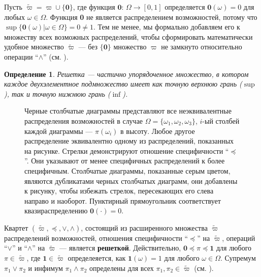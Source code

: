 \documentclass[a4paper, 14pt]{extarticle}
\newtheorem{definition}{Определение}
\begin{document}
Пусть $\widetilde{\varpi} = \varpi \cup \{ \textbf{0} \}$, где функция $\textbf{0}$: $\Omega \to [0, 1]$ определяется $\textbf{0}(\omega) = 0$ для любых $\omega \in \Omega$. Функция \textbf{0} не является распределением возможностей, потому что $\sup\{\textbf{0}(\omega) | \omega \in \Omega\} = 0 \neq 1$. Тем не менее, мы формально добавляем его к множеству всех возможных распределений, чтобы сформировать математически удобное множество $\widetilde{\varpi}$ --- без $\{ \textbf{0} \}$ множество ${\varpi}$ не замкнуто относительно операции ``$\land$'' (см. \cite{ag-op-2021}).
\begin{definition}
Решетка --- частично упорядоченное множество, в котором каждое двухэлементное подмножество имеет как точную верхнюю грань ($\sup$), так и точную нижнюю грань ($\inf$).
\end{definition}

\begin{figure}[h!]
\caption{Черные столбчатые диаграммы представляют все неэквивалентные распределения возможностей в случае $\Omega = \{\omega_1, \omega_2, \omega_3 \}$, $i$-ый столбей каждой диаграммы --- $\pi(\omega_i)$ в высоту. Любое другое распределение эквивалентно одному из распределений, показанных на рисунке. Стрелки демонстрируют отношение специфичности ``$\preceq$''. Они указывают от менее специфичных распределений к более специфичным. Столбчатые диаграммы, показанные серым цветом, являются дубликатами черных столбчатых диаграмм, они добавлены к рисунку, чтобы избежать стрелок, пересекающих его слева направо и наоборот. Пунктирный прямоугольник соответствует квазираспределению $\textbf{0}(\cdot) = 0$.}
\end{figure}

Квартет $(\widetilde{\varpi}, \preceq, \lor, \land)$, состоящий из расширенного множества $\widetilde{\varpi}$ распределений возможностей, отношения специфичности ``$\preceq$'' на $\widetilde{\varpi}$, операций ``$\lor$'' и ``$\land$'' на $\widetilde{\varpi}$ --- является \textbf{решеткой}. Действительно, $\textbf{0} \preceq \pi \preceq \textbf{1}$ для любого $\pi \in \widetilde{\varpi}$, где $\textbf{1} \in \widetilde{\varpi}$ определеяется, как $\textbf{1}(\omega) = 1$ для любого $\omega \in \Omega$. Супремум $\pi_1 \lor \pi_2$ и инфимум $\pi_1 \land \pi_2$ определены для всех $\pi_1, \pi_2 \in \widetilde{\varpi}$ (см. \cite{ag-op-2021}). 
\end{document}
